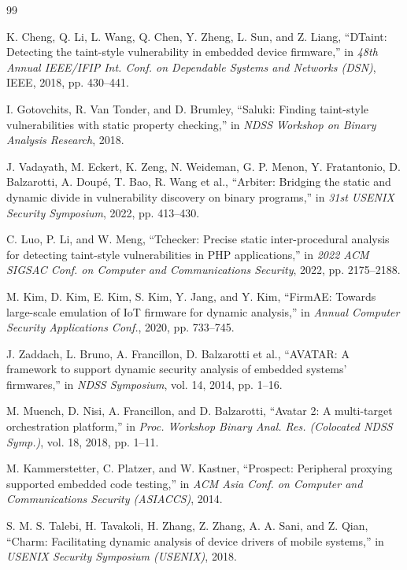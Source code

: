 \newpage

\begin{thebibliography}{99}

K. Cheng, Q. Li, L. Wang, Q. Chen, Y. Zheng, L. Sun, and Z. Liang, ``DTaint: Detecting the taint-style vulnerability in embedded device firmware,'' in \textit{48th Annual IEEE/IFIP Int. Conf. on Dependable Systems and Networks (DSN)}, IEEE, 2018, pp. 430--441.

I. Gotovchits, R. Van Tonder, and D. Brumley, ``Saluki: Finding taint-style vulnerabilities with static property checking,'' in \textit{NDSS Workshop on Binary Analysis Research}, 2018.

J. Vadayath, M. Eckert, K. Zeng, N. Weideman, G. P. Menon, Y. Fratantonio, D. Balzarotti, A. Doup\'{e}, T. Bao, R. Wang et al., ``Arbiter: Bridging the static and dynamic divide in vulnerability discovery on binary programs,'' in \textit{31st USENIX Security Symposium}, 2022, pp. 413--430.

C. Luo, P. Li, and W. Meng, ``Tchecker: Precise static inter-procedural analysis for detecting taint-style vulnerabilities in PHP applications,'' in \textit{2022 ACM SIGSAC Conf. on Computer and Communications Security}, 2022, pp. 2175--2188.

M. Kim, D. Kim, E. Kim, S. Kim, Y. Jang, and Y. Kim, ``FirmAE: Towards large-scale emulation of IoT firmware for dynamic analysis,'' in \textit{Annual Computer Security Applications Conf.}, 2020, pp. 733--745.

J. Zaddach, L. Bruno, A. Francillon, D. Balzarotti et al., ``AVATAR: A framework to support dynamic security analysis of embedded systems' firmwares,'' in \textit{NDSS Symposium}, vol. 14, 2014, pp. 1--16.

M. Muench, D. Nisi, A. Francillon, and D. Balzarotti, ``Avatar 2: A multi-target orchestration platform,'' in \textit{Proc. Workshop Binary Anal. Res. (Colocated NDSS Symp.)}, vol. 18, 2018, pp. 1--11.

M. Kammerstetter, C. Platzer, and W. Kastner, ``Prospect: Peripheral proxying supported embedded code testing,'' in \textit{ACM Asia Conf. on Computer and Communications Security (ASIACCS)}, 2014.

S. M. S. Talebi, H. Tavakoli, H. Zhang, Z. Zhang, A. A. Sani, and Z. Qian, ``Charm: Facilitating dynamic analysis of device drivers of mobile systems,'' in \textit{USENIX Security Symposium (USENIX)}, 2018.


\end{thebibliography}
